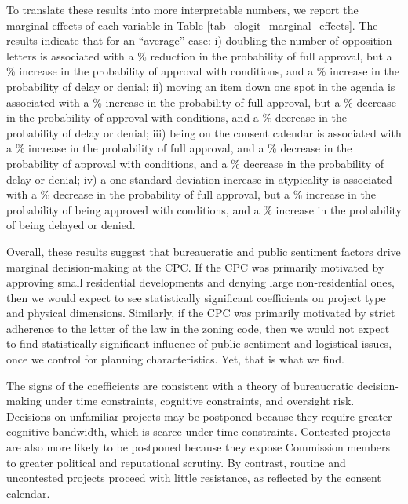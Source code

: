 To translate these results into more interpretable numbers, we report the marginal effects of each variable in Table \ref{tab_ologit_marginal_effects}. The results indicate that for an ``average'' case: i) doubling the number of opposition letters is associated with a \% reduction in the probability of full approval, but a \% increase in the probability of approval with conditions, and a \% increase in the probability of delay or denial; ii) moving an item down one spot in the agenda is associated with a \% increase in the probability of full approval, but a \% decrease in the probability of approval with conditions, and a \% decrease in the probability of delay or denial; iii) being on the consent calendar is associated with a \% increase in the probability of full approval, and a \% decrease in the probability of approval with conditions, and a \% decrease in the probability of delay or denial; iv) a one standard deviation increase in atypicality is associated with a \% decrease in the probability of full approval, but a \% increase in the probability of being approved with conditions, and a \% increase in the probability of being delayed or denied.

Overall, these results suggest that bureaucratic and public sentiment factors drive marginal decision-making at the CPC. If the CPC was primarily motivated by approving small residential developments and denying large non-residential ones, then we would expect to see statistically significant coefficients on project type and physical dimensions. Similarly, if the CPC was primarily motivated by strict adherence to the letter of the law in the zoning code, then we would not expect to find statistically significant influence of public sentiment and logistical issues, once we control for planning characteristics. Yet, that is what we find.

The signs of the coefficients are consistent with a theory of bureaucratic decision-making under time constraints, cognitive constraints, and oversight risk. Decisions on unfamiliar projects may be postponed because they require greater cognitive bandwidth, which is scarce under time constraints. Contested projects are also more likely to be postponed because they expose Commission members to greater political and reputational scrutiny. By contrast, routine and uncontested projects proceed with little resistance, as reflected by the consent calendar. 

